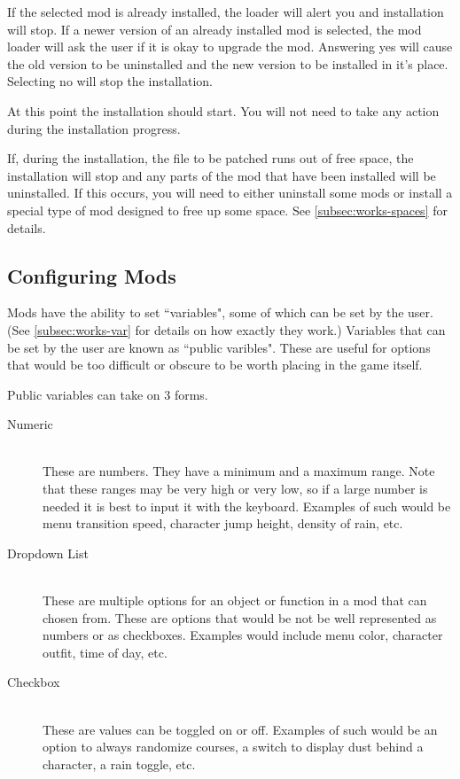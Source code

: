 \documentclass[12pt,a4paper,notitlepage]{article}
\begin{document}
If the selected mod is already installed, the loader will alert you and installation will stop. If a newer version of an already installed mod is selected, the mod loader will ask the user if it is okay to upgrade the mod. Answering yes will cause the old version to be uninstalled and the new version to be installed in it's place. Selecting no will stop the installation.

At this point the installation should start. You will not need to take any action during the installation progress.

If, during the installation, the file to be patched runs out of free space, the installation will stop and any parts of the mod that have been installed will be uninstalled. If this occurs, you will need to either uninstall some mods or install a special type of mod designed to free up some space. See \ref{subsec:works-spaces} for details.


\subsection{Configuring Mods}
\label{subsec:using-config}
Mods have the ability to set ``variables", some of which can be set by the user. (See \ref{subsec:works-var} for details on how exactly they work.) Variables that can be set by the user are known as ``public varibles". These are useful for options that would be too difficult or obscure to be worth placing in the game itself.

Public variables can take on 3 forms.

\begin{description}
\item[Numeric] \hfill \\ 
    These are numbers. They have a minimum and a maximum range. Note that these ranges may be very high or very low, so if a large number is needed it is best to input it with the keyboard. Examples of such would be menu transition speed, character jump height, density of rain, etc. 
\item[Dropdown List] \hfill \\
    These are multiple options for an object or function in a mod that can chosen from. These are options that would be not be well represented as numbers or as checkboxes. Examples would include menu color, character outfit, time of day, etc.
\item[Checkbox] \hfill \\
    These are values can be toggled on or off. Examples of such would be an option to always randomize courses, a switch to display dust behind a character, a rain toggle, etc.
\end{description} 
\end{document}
